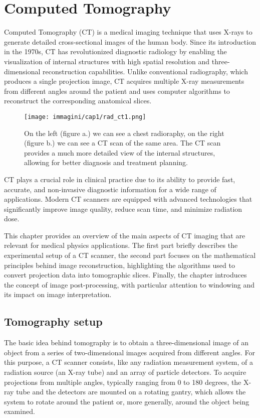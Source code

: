 \chapter{Computed Tomography}
Computed Tomography (CT) is a medical imaging technique that uses X-rays to generate detailed cross-sectional images of the human body. Since its introduction in the 1970s, CT has revolutionized diagnostic radiology by enabling the visualization of internal structures with high spatial resolution and three-dimensional reconstruction capabilities. Unlike conventional radiography, which produces a single projection image, CT acquires multiple X-ray measurements from different angles around the patient and uses computer algorithms to reconstruct the corresponding anatomical slices.

\begin{figure}[ht]
    \centering
    \texttt{[image: immagini/cap1/rad\_ct1.png]} 
    \caption{On the left (figure a.) we can see a chest radioraphy, on the right (figure b.) we can see a CT scan of the same area. The CT scan provides a much more detailed view of the internal structures, allowing for better diagnosis and treatment planning.}
    \label{fig:ct_scanner}
\end{figure}

CT plays a crucial role in clinical practice due to its ability to provide fast, accurate, and non-invasive diagnostic information for a wide range of applications. Modern CT scanners are equipped with advanced technologies that significantly improve image quality, reduce scan time, and minimize radiation dose.


This chapter provides an overview of the main aspects of CT imaging that are relevant for medical physics applications. The first part briefly describes the experimental setup of a CT scanner, the second part focuses on the mathematical principles behind image reconstruction, highlighting the algorithms used to convert projection data into tomographic slices. Finally, the chapter introduces the concept of image post-processing, with particular attention to windowing and its impact on image interpretation.

\section{Tomography setup}
The basic idea behind tomography is to obtain a three-dimensional image of an object from a series of two-dimensional images acquired from different angles.
For this purpose, a CT scanner consists, like any radiation measurement system, of a radiation source (an X-ray tube) and an array of particle detectors. To acquire projections from multiple angles, typically ranging from 0 to 180 degrees, the X-ray tube and the detectors are mounted on a rotating gantry, which allows the system to rotate around the patient or, more generally, around the object being examined. 

